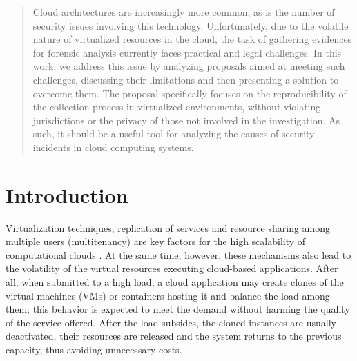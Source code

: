 \documentclass[conference]{IEEEtran}
\begin{document}
\maketitle

\begin{abstract}
Cloud architectures are increasingly more common, as is the number of security issues involving this technology. 
%
Unfortunately, due to the volatile nature of virtualized resources in the cloud, the task of gathering evidences for forensic analysis currently faces practical and legal challenges.
%
In this work, we address this issue by analyzing proposals aimed at meeting such challenges, discussing their limitations and then presenting a solution to overcome them.
%
The proposal specifically focuses on the reproducibility of the collection process in virtualized environments, without violating jurisdictions or the privacy of those not involved in the investigation.
%
As such, it should be a useful tool for analyzing the causes of security incidents in cloud computing systems.
\end{abstract}





%
\IEEEpeerreviewmaketitle

\section{Introduction}

%
Virtualization techniques, replication of services and resource sharing among multiple users (multitenancy) are key factors for the high scalability of computational clouds \cite{Morsy_Cloud_Security:2010}.
%
At the same time, however, these mechanisms also lead to the volatility of the virtual resources executing cloud-based applications.
%
After all, when submitted to a high load, a cloud application may create clones of the virtual machines (VMs) or containers hosting it and balance the load among them; this behavior is expected to meet the demand without harming the quality of the service offered.
%
After the load subsides, the cloned instances are usually deactivated, their resources are released and the system returns to the previous capacity, thus avoiding unnecessary costs.
\end{document}
